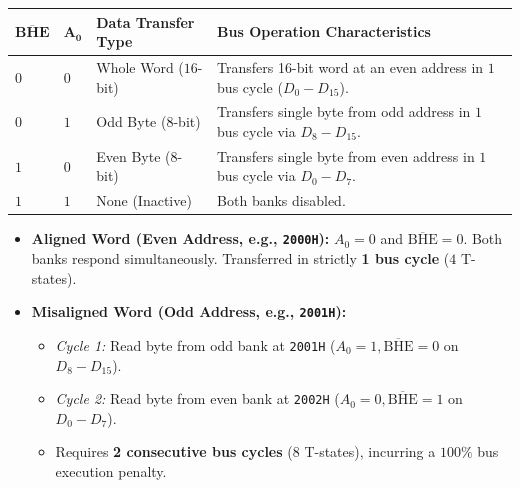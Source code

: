 \documentclass[12pt,a4paper]{article}
\begin{document}
\par\vspace{6pt}\noindent
\begingroup
\setlength{\extrarowheight}{2.5pt}
\noindent\begin{tabularx}{\linewidth}{|B{2.2cm}|B{2.2cm}|B{3.2cm}|Y|}
\hline
$\mathbf{\overline{BHE}}$ & $\mathbf{A_0}$ & \textbf{Data Transfer Type} & \textbf{Bus Operation Characteristics} \\ \hline
$0$ & $0$ & Whole Word ($16$-bit) & Transfers 16-bit word at an even address in $1$ bus cycle ($D_0-D_{15}$). \\ \hline
$0$ & $1$ & Odd Byte ($8$-bit) & Transfers single byte from odd address in $1$ bus cycle via $D_8-D_{15}$. \\ \hline
$1$ & $0$ & Even Byte ($8$-bit) & Transfers single byte from even address in $1$ bus cycle via $D_0-D_7$. \\ \hline
$1$ & $1$ & None (Inactive) & Both banks disabled. \\ \hline
\end{tabularx}\par
\endgroup

\begin{tcolorbox}[examplebox, title={Aligned vs. Misaligned Word Access Penalty}]
\begin{itemize}[leftmargin=*]
  \item \textbf{Aligned Word (Even Address, e.g., \texttt{2000H}):} $A_0=0$ and $\overline{\mathrm{BHE}}=0$. Both banks respond simultaneously. Transferred in strictly \textbf{1 bus cycle} ($4$ T-states).
  \item \textbf{Misaligned Word (Odd Address, e.g., \texttt{2001H}):}
  \begin{itemize}[leftmargin=*]
    \item \textit{Cycle 1:} Read byte from odd bank at \texttt{2001H} ($A_0=1, \overline{\mathrm{BHE}}=0$ on $D_8-D_{15}$).
    \item \textit{Cycle 2:} Read byte from even bank at \texttt{2002H} ($A_0=0, \overline{\mathrm{BHE}}=1$ on $D_0-D_7$).
    \item Requires \textbf{2 consecutive bus cycles} ($8$ T-states), incurring a $100\%$ bus execution penalty.
  \end{itemize}
\end{itemize}
\end{tcolorbox}
\end{document}
